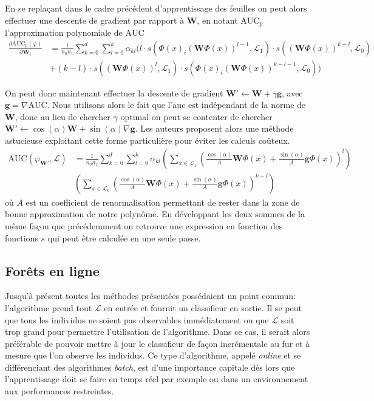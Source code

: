 En se replaçant dans le cadre précédent d'apprentissage des feuilles on peut alors effectuer une descente de gradient par rapport à $\mathbf{W}$, en notant $\mathrm{AUC}_p$ l'approximation polynomiale de $\mathrm{AUC}$
\begin{align*}
    \frac{\partial \mathrm{AUC}_p (\varphi) }{\partial \mathbf{W}_i} &= \frac{1}{n_0 n_1} \sum_{k=0}^d \sum_{l=0}^k \alpha_{kl} \big( l \cdot s( \Phi(x)_i \left( \mathbf{W} \Phi(x) \right)^{l-1} , \mathcal{L}_1) \cdot s( \left( \mathbf{W} \Phi(x) \right)^{k-l} , \mathcal{L}_0) \\
    &+ (k-l) \cdot s(\left( \mathbf{W} \Phi(x) \right)^l , \mathcal{L}_1) \cdot s( \Phi(x)_i \left( \mathbf{W} \Phi(x) \right)^{k-l-1} , \mathcal{L}_0) \big)
\end{align*}

On peut donc maintenant effectuer la descente de gradient $\mathbf{W}' \leftarrow \mathbf{W} + \gamma \mathbf{g}$, avec $\mathbf{g} = \nabla \mathrm{AUC}$. Nous utilisons alors le fait que l'\ac{auc} est indépendant de la norme de $\mathbf{W}$, donc au lieu de chercher $\gamma$ optimal on peut se contenter de chercher $\mathbf{W}' \leftarrow \cos (\alpha) \mathbf{W} + \sin (\alpha) \nabla \mathbf{g}$. Les auteurs proposent alors une méthode astucieuse exploitant cette forme particulière pour éviter les calculs coûteux.
\begin{align*}
    \mathrm{AUC} (\varphi_{\mathbf{W}'}, \mathcal{L}) &= \frac{1}{n_0 n_1} \sum_{k=0}^d \sum_{l=0}^k \alpha_{kl} \left( \sum_{x \in \mathcal{L}_1} \left( \frac{\cos (\alpha)}{A} \mathbf{W} \Phi(x) + \frac{\sin (\alpha)}{A} \mathbf{g} \Phi(x) \right)^l \right) \\
    & \left( \sum_{x \in \mathcal{L}_0} \left( \frac{\cos (\alpha)}{A} \mathbf{W} \Phi(x) + \frac{\sin (\alpha)}{A} \mathbf{g} \Phi(x) \right)^{k-l} \right)
\end{align*}
où $A$ est un coefficient de renormalisation permettant de rester dans la zone de bonne approximation de notre polynôme. En développant les deux sommes de la même façon que précédemment on retrouve une expression en fonction des fonctions $s$ qui peut être calculée en une seule passe.

\subsection{Forêts en ligne}

Jusqu'à présent toutes les méthodes présentées possédaient un point commun: l'algorithme prend tout $\mathcal{L}$ en entrée et fournit un classifieur en sortie. Il se peut que tous les individus ne soient pas observables immédiatement ou que $\mathcal{L}$ soit trop grand pour permettre l'utilisation de l'algorithme. Dans ce cas, il serait alors préférable de pouvoir mettre à jour le classifieur de façon incrémentale au fur et à mesure que l'on observe les individus. Ce type d'algorithme, appelé \emph{online} et se différenciant des algorithmes \emph{batch}, est d'une importance capitale dès lors que l'apprentissage doit se faire en temps réel par exemple ou dans un environnement aux performances restreintes.

